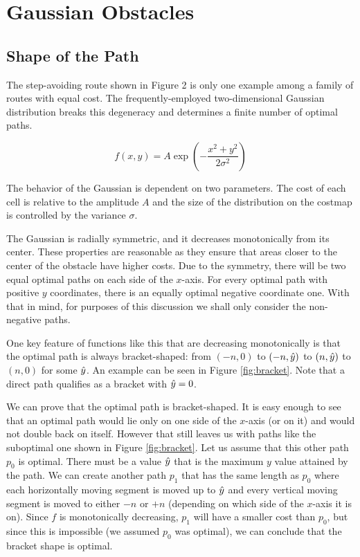 \section{Gaussian Obstacles}
\subsection{Shape of the Path}
The step-avoiding route shown in Figure 2 is only one example among a family of routes with equal cost. The frequently-employed two-dimensional Gaussian distribution 
breaks this degeneracy and determines a finite number of optimal paths.


\begin{equation}
f(x, y) = A \exp\left(-\displaystyle\frac{x^2+y^2}{2\sigma^2}\right)
\end{equation}

The behavior of the Gaussian is dependent on two parameters. The cost of each cell is relative to the amplitude $A$ and the size of the distribution on the costmap is controlled by the variance $\sigma$. 

The Gaussian is radially symmetric, and it decreases monotonically from its center. These properties are reasonable as they ensure that areas closer to the center of the obstacle have higher costs. Due to the symmetry, there will be two equal optimal paths on each side of the $x$-axis. For every optimal path with positive $y$ coordinates, there is an equally optimal negative coordinate one. With that in mind, for purposes of this discussion we shall only consider the non-negative paths. 

One key feature of functions like this that are decreasing monotonically is that the optimal path is always bracket-shaped: from $(-n,0)$ to $(-n, \hat{y})$ to $(n, \hat{y})$ to $(n,0)$ for some $\hat{y}$. An example can be seen in Figure \ref{fig:bracket}. Note that a direct path qualifies as a bracket with $\hat{y}=0$.

We can prove that the optimal path is bracket-shaped. It is easy enough to see that an optimal path would lie only on one side of the $x$-axis (or on it) and would not double back on itself. However that still leaves us with paths like the suboptimal one shown in Figure \ref{fig:bracket}. Let us assume that this other path $p_0$ is optimal. There must be a value $\hat{y}$ that is the maximum $y$ value attained by the path. We can create another path $p_1$ that has the same length as $p_0$ where each horizontally moving segment is moved up to $\hat{y}$ and every vertical moving segment is moved to either $-n$ or $+n$ (depending on which side of the $x$-axis it is on). Since $f$ is monotonically decreasing, $p_1$ will have a smaller cost than $p_0$, but since this is impossible (we assumed $p_0$ was optimal), we can conclude that the bracket shape is optimal.  

